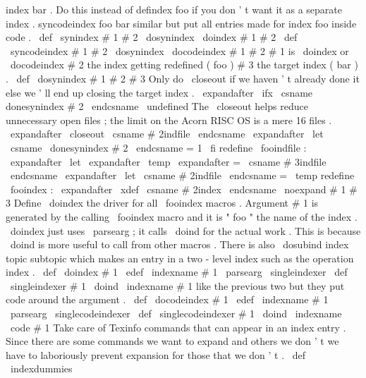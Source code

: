 index
bar
.
%
Do
this
instead
of
defindex
foo
if
you
don
'
t
want
it
as
a
separate
index
.
%
%
syncodeindex
foo
bar
similar
but
put
all
entries
made
for
index
foo
%
inside
code
.
%
\
def
\
synindex
#
1
#
2
{
\
dosynindex
\
doindex
{
#
1
}
{
#
2
}
}
\
def
\
syncodeindex
#
1
#
2
{
\
dosynindex
\
docodeindex
{
#
1
}
{
#
2
}
}
%
#
1
is
\
doindex
or
\
docodeindex
#
2
the
index
getting
redefined
(
foo
)
%
#
3
the
target
index
(
bar
)
.
\
def
\
dosynindex
#
1
#
2
#
3
{
%
%
Only
do
\
closeout
if
we
haven
'
t
already
done
it
else
we
'
ll
end
up
%
closing
the
target
index
.
\
expandafter
\
ifx
\
csname
donesynindex
#
2
\
endcsname
\
undefined
%
The
\
closeout
helps
reduce
unnecessary
open
files
;
the
limit
on
the
%
Acorn
RISC
OS
is
a
mere
16
files
.
\
expandafter
\
closeout
\
csname
#
2indfile
\
endcsname
\
expandafter
\
let
\
csname
\
donesynindex
#
2
\
endcsname
=
1
\
fi
%
redefine
\
fooindfile
:
\
expandafter
\
let
\
expandafter
\
temp
\
expandafter
=
\
csname
#
3indfile
\
endcsname
\
expandafter
\
let
\
csname
#
2indfile
\
endcsname
=
\
temp
%
redefine
\
fooindex
:
\
expandafter
\
xdef
\
csname
#
2index
\
endcsname
{
\
noexpand
#
1
{
#
3
}
}
%
}
%
Define
\
doindex
the
driver
for
all
\
fooindex
macros
.
%
Argument
#
1
is
generated
by
the
calling
\
fooindex
macro
%
and
it
is
"
foo
"
the
name
of
the
index
.
%
\
doindex
just
uses
\
parsearg
;
it
calls
\
doind
for
the
actual
work
.
%
This
is
because
\
doind
is
more
useful
to
call
from
other
macros
.
%
There
is
also
\
dosubind
{
index
}
{
topic
}
{
subtopic
}
%
which
makes
an
entry
in
a
two
-
level
index
such
as
the
operation
index
.
\
def
\
doindex
#
1
{
\
edef
\
indexname
{
#
1
}
\
parsearg
\
singleindexer
}
\
def
\
singleindexer
#
1
{
\
doind
{
\
indexname
}
{
#
1
}
}
%
like
the
previous
two
but
they
put
code
around
the
argument
.
\
def
\
docodeindex
#
1
{
\
edef
\
indexname
{
#
1
}
\
parsearg
\
singlecodeindexer
}
\
def
\
singlecodeindexer
#
1
{
\
doind
{
\
indexname
}
{
\
code
{
#
1
}
}
}
%
Take
care
of
Texinfo
commands
that
can
appear
in
an
index
entry
.
%
Since
there
are
some
commands
we
want
to
expand
and
others
we
don
'
t
%
we
have
to
laboriously
prevent
expansion
for
those
that
we
don
'
t
.
%
\
def
\
indexdummies
